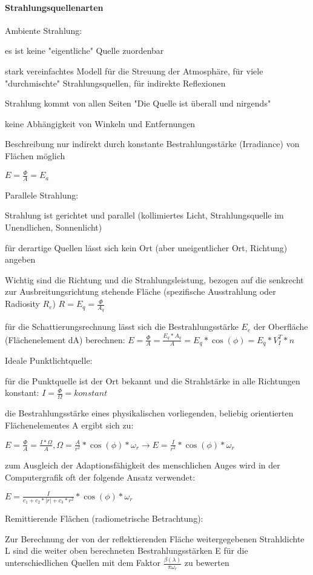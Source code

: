 \documentclass[landscape]{article}
\begin{document}
\begin{multicols}{3}
  \paragraph{Strahlungsquellenarten}
  \begin{itemize*}
    \item Ambiente Strahlung:
    \item es ist keine "eigentliche" Quelle zuordenbar
    \item stark vereinfachtes Modell für die Streuung der Atmosphäre, für viele "durchmischte" Strahlungsquellen, für indirekte Reflexionen
    \item Strahlung kommt von allen Seiten "Die Quelle ist überall und nirgends"
    \item keine Abhängigkeit von Winkeln und Entfernungen
    \item Beschreibung nur indirekt durch konstante Bestrahlungsstärke (Irradiance) von Flächen möglich
    \item $E=\frac{\Phi}{A}=E_a$
    \item Parallele Strahlung:
    \item Strahlung ist gerichtet und parallel (kollimiertes Licht, Strahlungsquelle im Unendlichen, Sonnenlicht)
    \item für derartige Quellen lässt sich kein Ort (aber uneigentlicher Ort, Richtung) angeben
    \item Wichtig sind die Richtung und die Strahlungsleistung, bezogen auf die senkrecht zur Ausbreitungsrichtung stehende Fläche (spezifische Ausstrahlung oder Radiosity $R_e$) $R=E_q=\frac{\Phi}{A_q}$
    \item für die Schattierungsrechnung lässt sich die Bestrahlungsstärke $E_e$ der Oberfläche (Flächenelement dA) berechnen: $E=\frac{\Phi}{A}=\frac{E_q*A_q}{A}=E_q*\cos(\phi) = E_q*V_I^T*n$
    \item Ideale Punktlichtquelle:
    \item für die Punktquelle ist der Ort bekannt und die Strahlstärke in alle Richtungen konstant: $I=\frac{\Phi}{\Omega}=konstant$
    \item die Bestrahlungsstärke eines physikalischen vorliegenden, beliebig orientierten Flächenelementes A ergibt sich zu:
    \item $E=\frac{\Phi}{A}=\frac{I*\Omega}{A}, \Omega=\frac{A}{r^2}*\cos(\phi)*\omega_r \rightarrow E=\frac{I}{r^2}*\cos(\phi)*\omega_r$
    \item zum Ausgleich der Adaptionsfähigkeit des menschlichen Auges wird in der Computergrafik oft der folgende Ansatz verwendet:
    \item $E=\frac{I}{c_1+c_2*|r|+c_3*r^2}*\cos(\phi)*\omega_r$
    \item Remittierende Flächen (radiometrische Betrachtung):
    \item Zur Berechnung der von der reflektierenden Fläche weitergegebenen Strahldichte L sind die weiter oben berechneten Bestrahlungsstärken E für die unterschiedlichen Quellen mit dem Faktor $\frac{\beta(\lambda)}{\pi\omega_r}$ zu bewerten
  \end{itemize*}
  

\end{multicols}
\end{document}
